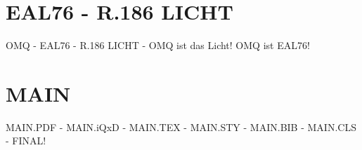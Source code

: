 \documentclass{MAIN}
\begin{document}
\maketitle
\section*{EAL76 - R.186 LICHT}
OMQ - EAL76 - R.186 LICHT - OMQ ist das Licht! OMQ ist EAL76!
\section*{MAIN}
MAIN.PDF - MAIN.iQxD - MAIN.TEX - MAIN.STY - MAIN.BIB - MAIN.CLS - FINAL!
\end{document}
